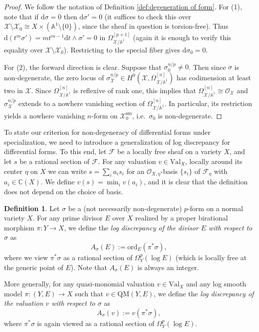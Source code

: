 \documentclass[12pt]{amsart}
\theoremstyle{definition}
\newtheorem{defn}[prop]{Definition}
\newcommand{\bC}{\mathbb{C}}
\newcommand{\bA}{\mathbb{A}}
\newcommand{\cO}{\mathcal{O}}
\newcommand{\cF}{\mathcal{F}}
\newcommand{\scX}{\mathscr{X}}
\newcommand{\rd}{\mathrm{d}}
\newcommand{\ord}{\mathrm{ord}}
\newcommand{\Val}{\mathrm{Val}}
\newcommand{\QM}{\mathrm{QM}}
\numberwithin{equation}{section}
\begin{document}
\begin{proof}
We follow the notation of Definition \ref{def:degeneration of form}. 
For (1), note that if $\rd\sigma=0$ then $\rd\sigma'=0$ (it suffices to check this over $\scX\setminus \scX_0\cong X\times (\bA^1\setminus \{0\})$, since the sheaf in question is torsion-free). Thus $\rd(t^m\sigma') = mt^{m-1}\rd t\wedge\sigma'=0$ in $\Omega_{\scX/\bA^1}^{[p+1]}$ (again it is enough to verify this equality over $\scX\setminus \scX_0$). Restricting to the special fiber gives $\rd \sigma_0 = 0$.

For (2), the forward direction is clear. Suppose that $\sigma_0^{n/p}\neq 0$. Then since $\sigma$ is non-degenerate, the zero locus of $\sigma_{\scX}^{n/p} \in H^0(\scX,\Omega_{\scX/\bA^1}^{[n]})$ has codimension at least two in $\scX$. Since $\Omega_{\scX/\bA^1}^{[n]}$ is reflexive of rank one, this implies that $\Omega_{\scX/\bA^1}^{[n]}\cong \cO_{\scX}$ and $\sigma_{\scX}^{n/p}$ extends to a nowhere vanishing section of $\Omega_{\scX/\bA^1}^{[n]}$. In particular, its restriction yields a nowhere vanishing $n$-form on $\scX_0^{\mathrm{sm}}$, i.e.\ $\sigma_{0}$ is non-degenerate.
\end{proof}

To state our criterion for non-degeneracy of differential forms under specialization, we need to introduce a generalization of log discrepancy for differential forms. To this end, let $\cF$ be a locally free sheaf on a variety $X$, and let $s$ be a rational section of $\cF$. For any valuation $v\in \Val_X$, locally around its center $\eta$ on $X$ we can write $s=\sum_i a_is_i$ for an $\cO_{X,\eta}$-basis $\{s_i\}$ of $\cF_{\eta}$ with $a_i\in \bC(X)$. We define $v(s)=\min_i v(a_i)$, and it is clear that the definition does not depend on the choice of basis.

\begin{defn}\label{defn-log discrepancy with respect to a form}
Let $\sigma$ be a (not necessarily non-degenerate) $p$-form on a normal variety $X$. For any prime divisor $E$ over $X$ realized by a proper birational morphism $\pi\colon Y\to X$, we define the \emph{log discrepancy of the divisor $E$ with respect to $\sigma$} as
\[
A_{\sigma}(E):=\ord_E(\pi^*\sigma),
\]
where we view $\pi^*\sigma$ as a rational section of $\Omega^p_Y(\log E)$ (which is locally free at the generic point of $E$). Note that $A_\sigma(E)$ is always an integer.

More generally, for any quasi-monomial valuation $v\in \Val_X$ and any log smooth model $\pi\colon (Y,E)\to X$ such that $v\in \QM(Y,E)$, we define the \emph{log discrepancy of the valuation $v$ with respect to $\sigma$} as
\[
A_{\sigma}(v) := v(\pi^*\sigma),
\]
where $\pi^*\sigma$ is again viewed as a rational section of $\Omega^p_Y(\log E)$.
\end{defn}
\end{document}
